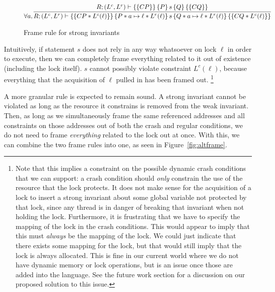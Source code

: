 \begin{figure*}
\begin{gather*}
    \forall a, \infer
	{\hoarestmt{R}{(L^c,L^r)}{CP * L^c(\ell)}{P * a \mapsto \ell * L^r(\ell)}{s}{Q * a \mapsto \ell * L^r(\ell)}{CQ * L^c(\ell)}}
	{\hoarestmt{R}{(L^c,L^r)}{CP}{P}{s}{Q}{CQ}}
\end{gather*}
\caption{Frame rule for strong invariants}
\label{fig:stronginv}
\end{figure*}

Intuitively, if statement $s$ does not rely in any way whatsoever on lock $\ell$
in order to execute, then we can completely frame everything related to it out
of existence (including the lock itself).
$s$ cannot possibly violate constraint
$L^c(\ell)$, because everything that the acquisition of $\ell$ pulled in has
been framed out.
\footnote{Note that this implies a constraint on the possible
dynamic crash conditions that we can support: a crash condition should
\textit{only} constrain the use of the resource that the lock
protects.
It does
not make sense for the acquisition of a lock to insert a strong invariant about
some global variable not protected by that lock, since any thread is in danger
of breaking that invariant when not holding the lock.
Furthermore, it is
frustrating that we have to specify the mapping of the lock in the crash
conditions.
This would appear to imply that this must \textit{always} be the
mapping of the lock.
We could just indicate that there exists some mapping
for the lock, but that would still imply that the lock is always allocated.
This is fine in our current world where we do not have dynamic memory or lock
operations, but is an issue once those are added into the language.
See the
future work section for a discussion on our proposed solution to this issue.}

A more granular rule is expected to remain sound.
A strong invariant cannot be
violated as long as the resource it constrains is removed from the weak
invariant.
Then, as long as we simultaneously frame the same referenced
addresses and all constraints on those addresses out of both the crash and
regular conditions, we do not need to frame \textit{everything} related to the
lock out at once.
With this, we can combine the two frame rules into one, as
seen in Figure~\ref{fig:altframe}.


